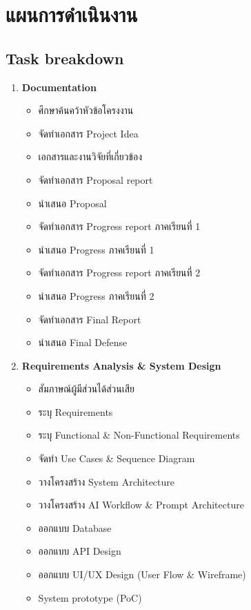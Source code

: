 \section{แผนการดำเนินงาน}
\subsection{Task breakdown}
\begin{enumerate}
  \item \textbf{Documentation}
    \begin{itemize}
      \item ศึกษาค้นคว้าหัวข้อโครงงาน
      \item จัดทำเอกสาร Project Idea
      \item เอกสารและงานวิจัยที่เกี่ยวข้อง
      \item จัดทำเอกสาร Proposal report
      \item นำเสนอ Proposal
      \item จัดทำเอกสาร Progress report ภาคเรียนที่ 1
      \item นำเสนอ Progress ภาคเรียนที่ 1
      \item จัดทำเอกสาร Progress report ภาคเรียนที่ 2
      \item นำเสนอ Progress ภาคเรียนที่ 2
      \item จัดทำเอกสาร Final Report
      \item นำเสนอ Final Defense
    \end{itemize}

  \item \textbf{Requirements Analysis \& System Design}
    \begin{itemize}
      \item สัมภาษณ์ผู้มีส่วนได้ส่วนเสีย
      \item ระบุ Requirements
      \item ระบุ Functional \& Non-Functional Requirements
      \item จัดทำ Use Cases \& Sequence Diagram
      \item วางโครงสร้าง System Architecture
      \item วางโครงสร้าง AI Workflow \& Prompt Architecture
      \item ออกแบบ Database
      \item ออกแบบ API Design
      \item ออกแบบ UI/UX Design (User Flow \& Wireframe)
      \item System prototype (PoC)
    \end{itemize}


\end{enumerate}
